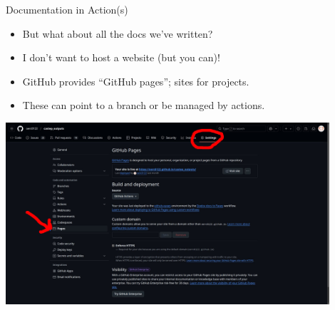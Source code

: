 \documentclass[usenames,dvipsnames]{beamer}
\begin{document}
\begin{frame}{Documentation in Action(s)}
    \begin{itemize}[<+->]
        \item{}But what about all the docs we've written?
        \item{}I don't want to host a website (but you can)!
        \item{}GitHub provides ``GitHub pages''; sites for projects.
        \item{}These can point to a branch or be managed by actions.
    \end{itemize}

     {
        \begin{center}
            \includegraphics[width=0.9\textwidth]{Images/ghpages.jpg}
        \end{center}
    }
\end{frame}
\end{document}

